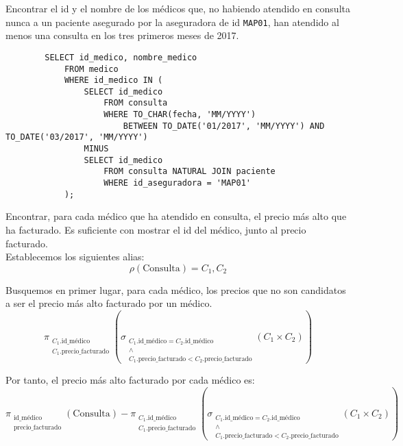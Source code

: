 \documentclass[12pt]{article}
\begin{document}
\begin{ejercicio}[SQL]
    Encontrar el id y el nombre de los médicos que, no habiendo atendido en consulta nunca a un paciente asegurado por la aseguradora de id \verb|MAP01|, han atendido al menos una consulta en los tres primeros meses de 2017.\\
    \begin{verbatim}
        SELECT id_medico, nombre_medico
            FROM medico
            WHERE id_medico IN (
                SELECT id_medico
                    FROM consulta
                    WHERE TO_CHAR(fecha, 'MM/YYYY')
                        BETWEEN TO_DATE('01/2017', 'MM/YYYY') AND TO_DATE('03/2017', 'MM/YYYY')
                MINUS
                SELECT id_medico
                    FROM consulta NATURAL JOIN paciente
                    WHERE id_aseguradora = 'MAP01'
            );
    \end{verbatim}
\end{ejercicio}

\begin{ejercicio}[AR]
    Encontrar, para cada médico que ha atendido en consulta, el precio más alto que ha facturado. Es suficiente con mostrar el id del médico, junto al precio facturado.\\

    Establecemos los siguientes alias:
    \begin{equation*}
        \rho(\text{Consulta})=C_1,C_2
    \end{equation*}
    
    Busquemos en primer lugar, para cada médico, los precios que no son candidatos a ser el precio más alto facturado por un médico.
    \begin{equation*}
        \pi_{\substack{C_1.\text{id\_médico}\\C_1.\text{precio\_facturado}}}\left(\sigma_{\substack{C_1.\text{id\_médico}=C_2.\text{id\_médico}\\\land\\C_1.\text{precio\_facturado}<C_2.\text{precio\_facturado}}}(C_1\times C_2)\right)
    \end{equation*}

    Por tanto, el precio más alto facturado por cada médico es:
    \begin{equation*}
        \pi_{\substack{\text{id\_médico}\\\text{precio\_facturado}}}\left(\text{Consulta}\right)
        -
        \pi_{\substack{C_1.\text{id\_médico}\\C_1.\text{precio\_facturado}}}\left(\sigma_{\substack{C_1.\text{id\_médico}=C_2.\text{id\_médico}\\\land\\C_1.\text{precio\_facturado}<C_2.\text{precio\_facturado}}}(C_1\times C_2)\right)
    \end{equation*}
\end{ejercicio}
\end{document}
